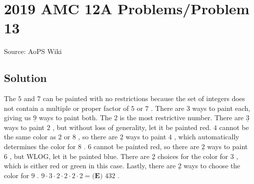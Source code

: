 \documentclass[12pt]{article}
\begin{document}
\section*{{2019 AMC 12A Problems/Problem 13}}
Source: AoPS Wiki

\subsection*{Solution}
The $5$ and $7$ can be painted with no restrictions because the set of integers does not contain a multiple or proper factor of $5$ or $7$ . There are 3 ways to paint each, giving us $\underline{9}$ ways to paint both. The $2$ is the most restrictive number. There are $\underline{3}$ ways to paint $2$ , but without loss of generality, let it be painted red. $4$ cannot be the same color as $2$ or $8$ , so there are $\underline{2}$ ways to paint $4$ , which automatically determines the color for $8$ . $6$ cannot be painted red, so there are $\underline{2}$ ways to paint $6$ , but WLOG, let it be painted blue. There are $\underline{2}$ choices for the color for $3$ , which is either red or green in this case. Lastly, there are $\underline{2}$ ways to choose the color for $9$ . $9 \cdot 3 \cdot 2 \cdot 2 \cdot 2 \cdot 2 = \boxed{\textbf{(E) }432}$ .
\end{document}
